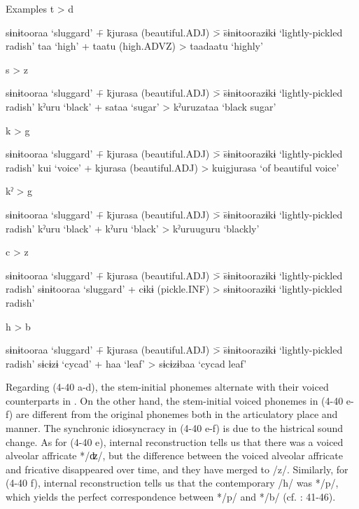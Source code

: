 \ea  Examples \label{ex:4.40}
\ea\label{ex:4.40a}  t > d \\
    \begin{tabbing} sɨnɨtooraa ‘sluggard’ \= + \= kjurasa (beautiful.ADJ) \= > \= sɨnɨtoorazɨkɨ ‘lightly-pickled radish’\kill
    taa  ‘high’ \> + \> taatu  (high.ADVZ) \> > \> taadaatu  ‘highly’
    \end{tabbing}
\ex\label{ex:4.40b}  s > z \\
    \begin{tabbing} sɨnɨtooraa ‘sluggard’ \= + \= kjurasa (beautiful.ADJ) \= > \= sɨnɨtoorazɨkɨ ‘lightly-pickled radish’\kill
    kˀuru  ‘black’ \> + \> sataa  ‘sugar’ \> > \> kˀuruzataa  ‘black sugar’
    \end{tabbing}
\ex\label{ex:4.40c} k > g \\
    \begin{tabbing} sɨnɨtooraa ‘sluggard’ \= + \= kjurasa (beautiful.ADJ) \= > \= sɨnɨtoorazɨkɨ ‘lightly-pickled radish’\kill
    kui  ‘voice’ \> + \> kjurasa  (beautiful.ADJ) \> > \> kuigjurasa  ‘of beautiful voice’
    \end{tabbing}
\ex\label{ex:4.40d} kˀ > g\\
    \begin{tabbing} sɨnɨtooraa ‘sluggard’ \= + \= kjurasa (beautiful.ADJ) \= > \= sɨnɨtoorazɨkɨ ‘lightly-pickled radish’\kill
    kˀuru  ‘black’ \> + \> kˀuru  ‘black’ \> > \> kˀuruuguru  ‘blackly’
    \end{tabbing}

\ex\label{ex:4.40e} c > z \\
    \begin{tabbing} sɨnɨtooraa ‘sluggard’ \= + \= kjurasa (beautiful.ADJ) \= > \= sɨnɨtoorazɨkɨ ‘lightly-pickled radish’\kill
    sɨnɨtooraa  ‘sluggard’ \> + \> cɨkɨ  (pickle.INF) \> > \> sɨnɨtoorazɨkɨ  ‘lightly-pickled radish’
    \end{tabbing}

\ex\label{ex:4.40f} h > b \\
    \begin{tabbing} sɨnɨtooraa ‘sluggard’ \= + \= kjurasa (beautiful.ADJ) \= > \= sɨnɨtoorazɨkɨ ‘lightly-pickled radish’\kill
    sɨcɨzɨ  ‘cycad’ \> + \> haa  ‘leaf’ \> > \> sɨcɨzɨbaa  ‘cycad leaf’
    \end{tabbing}
    \z
\z

Regarding (4-40 a-d), the stem-initial phonemes alternate with their voiced counterparts in . On the other hand, the stem-initial voiced phonemes in (4-40 e-f) are different from the original phonemes both in the articulatory place and manner. The synchronic idiosyncracy in (4-40 e-f) is due to the histrical sound change. As for (4-40 e), internal reconstruction tells us that there was a voiced alveolar affricate */ʣ/, but the difference between the voiced alveolar affricate and fricative disappeared over time, and they have merged to /z/. Similarly, for (4-40 f), internal reconstruction tells us that the contemporary /h/ was */p/, which yields the perfect correspondence between */p/ and */b/ (cf. \citealt{Ueda1898}: 41-46).

